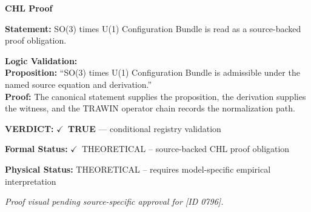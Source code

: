 \vspace{0.45em}
\noindent\textbf{CHL Proof}\par
\textbf{Statement:} SO(3) times U(1) Configuration Bundle is read as a source-backed proof obligation.

\textbf{Logic Validation:}\\
\textbf{Proposition:} ``SO(3) times U(1) Configuration Bundle is admissible under the named source equation and derivation.''\\
\textbf{Proof:} The canonical statement supplies the proposition, the derivation supplies the witness, and the TRAWIN operator chain records the normalization path.

\textbf{VERDICT:} \ensuremath{\checkmark}\ \textbf{TRUE} --- conditional registry validation

\textbf{Formal Status:} \ensuremath{\checkmark}\ THEORETICAL -- source-backed CHL proof obligation

\textbf{Physical Status:} THEORETICAL -- requires model-specific empirical interpretation
\par\vspace{0.45em}
\par
\vfill
\begingroup\footnotesize\itshape
Proof visual pending source-specific approval for [ID 0796].
\par\endgroup
\vfill
\endgroup
\endgroup

